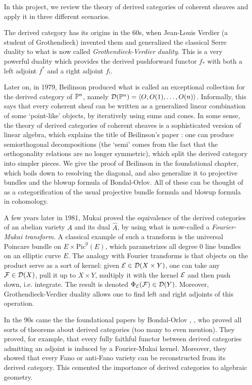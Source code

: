 In this project, we review the theory of derived categories of coherent sheaves and apply it in three different scenarios.

The derived category has its origins in the 60s, when Jean-Louis Verdier (a student of Grothendieck) invented them and generalized the classical Serre duality to what is now called \emph{Grothendieck-Verdier duality}. This is a very powerful duality which provides the derived pushforward functor $f_*$ with both a left adjoint $f^*$ and a right adjoint $f_!$. 

Later on, in 1979, Beilinson produced what is called an exceptional collection for the derived category of $\P^n$, namely $\calD(\P^n)=\langle O, O(1),\dots, O(n)\rangle$. Informally, this says that every coherent sheaf can be written as a generalized linear combination of some `point-like' objects, by iteratively using sums and cones. In some sense, the theory of derived categories of coherent sheaves is a sophisticated version of linear algebra, which explains the title of Beilinson's paper \cite{Beilinson1978}: one can produce semiorthogonal decompositions (the `semi' comes from the fact that the orthogonality relations are no longer symmetric), which split the derived category into simpler pieces. We give the proof of Beilinson in the foundational chapter, which boils down to resolving the diagonal, and also generalize it to projective bundles and the blowup formula of Bondal-Orlov. All of these can be thought of as a categorification of the usual projective bundle formula and blowup formula in cohomology.

A few years later in 1981, Mukai proved the equivalence of the derived categories of an abelian variety $A$ and its dual $\hat{A}$, by using what is now-called a \emph{Fourier-Mukai transform.} A classical example of such a transform is the universal Poincare bundle on $E\times \mathrm{Pic}^0(E)$, which parametrizes all degree $0$ line bundles on an elliptic curve $E$. The analogy with Fourier transforms is that objects on the product serve as a sort of kernel: given $\calE\in \calD(X\times Y)$, one can take any $\calF \in \calD(X)$, pull it up to $X\times Y$, multiply it with the kernel $\calE$ and then push down, i.e. integrate. The result is denoted $\Phi_\calE (\calF)\in \calD(Y)$. Moreover, Grothendieck-Verdier duality allows one to find left and right adjoints of this operation.

In the 90s came the the foundational papers by Bondal-Orlov \cite{bondal_semiorthogonal_1995}, \cite{bondal_reconstruction_2001}, who proved all sorts of theorems about derived categories (too many to even mention). They proved, for example, that every fully faithful functor between derived categories admitting an adjoint is induced by a Fourier-Mukai kernel. Moreover, they showed that every Fano or anti-Fano variety can be reconstructed from its derived category. This cemented the importance of derived categories to algebraic geometry.

